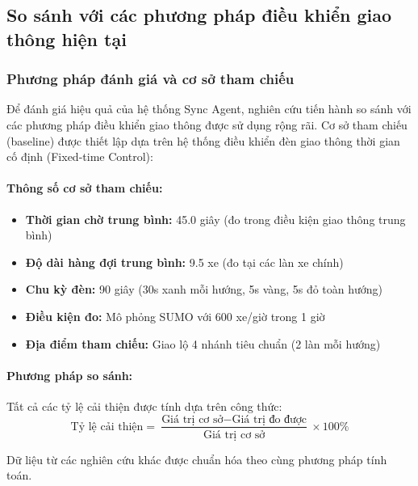 \subsection{So sánh với các phương pháp điều khiển giao thông hiện tại}

\subsubsection{Phương pháp đánh giá và cơ sở tham chiếu}

Để đánh giá hiệu quả của hệ thống Sync Agent, nghiên cứu tiến hành so sánh với các phương pháp điều khiển giao thông được sử dụng rộng rãi. Cơ sở tham chiếu (baseline) được thiết lập dựa trên hệ thống điều khiển đèn giao thông thời gian cố định (Fixed-time Control):

\paragraph{Thông số cơ sở tham chiếu:}
\begin{itemize}
    \item \textbf{Thời gian chờ trung bình:} 45.0 giây (đo trong điều kiện giao thông trung bình)
    \item \textbf{Độ dài hàng đợi trung bình:} 9.5 xe (đo tại các làn xe chính)
    \item \textbf{Chu kỳ đèn:} 90 giây (30s xanh mỗi hướng, 5s vàng, 5s đỏ toàn hướng)
    \item \textbf{Điều kiện đo:} Mô phỏng SUMO với 600 xe/giờ trong 1 giờ
    \item \textbf{Địa điểm tham chiếu:} Giao lộ 4 nhánh tiêu chuẩn (2 làn mỗi hướng)
\end{itemize}

\paragraph{Phương pháp so sánh:}
Tất cả các tỷ lệ cải thiện được tính dựa trên công thức:
\begin{equation}
\text{Tỷ lệ cải thiện} = \frac{\text{Giá trị cơ sở} - \text{Giá trị đo được}}{\text{Giá trị cơ sở}} \times 100\%
\end{equation}

Dữ liệu từ các nghiên cứu khác được chuẩn hóa theo cùng phương pháp tính toán.

